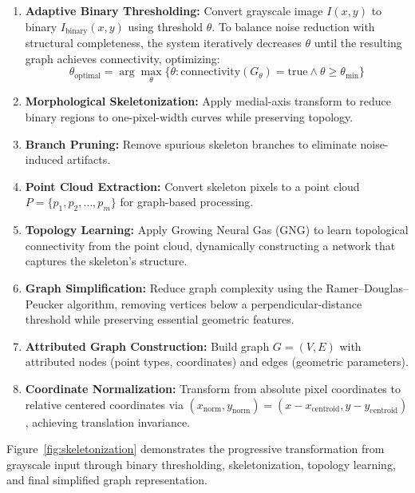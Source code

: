 \documentclass[12pt, a4paper]{article}
\begin{document}
\begin{enumerate}
\item \textbf{Adaptive Binary Thresholding:} Convert grayscale image $I(x,y)$ to binary $I_{\text{binary}}(x,y)$ using threshold $\theta$. To balance noise reduction with structural completeness, the system iteratively decreases $\theta$ until the resulting graph achieves connectivity, optimizing:
\[
\theta_{\text{optimal}} = \arg\max_{\theta} \{\theta : \text{connectivity}(G_{\theta}) = \text{true} \land \theta \geq \theta_{\text{min}}\}
\]

\item \textbf{Morphological Skeletonization:} Apply medial-axis transform to reduce binary regions to one-pixel-width curves while preserving topology.

\item \textbf{Branch Pruning:} Remove spurious skeleton branches to eliminate noise-induced artifacts.

\item \textbf{Point Cloud Extraction:} Convert skeleton pixels to a point cloud $P = \{p_1, p_2, \dots, p_m\}$ for graph-based processing.

\item \textbf{Topology Learning:} Apply Growing Neural Gas (GNG) \cite{fritzke1995} to learn topological connectivity from the point cloud, dynamically constructing a network that captures the skeleton's structure.

\item \textbf{Graph Simplification:} Reduce graph complexity using the Ramer--Douglas--Peucker algorithm, removing vertices below a perpendicular-distance threshold while preserving essential geometric features.

\item \textbf{Attributed Graph Construction:} Build graph $G = (V, E)$ with attributed nodes (point types, coordinates) and edges (geometric parameters).

\item \textbf{Coordinate Normalization:} Transform from absolute pixel coordinates to relative centered coordinates via $(x_{\text{norm}}, y_{\text{norm}}) = (x - x_{\text{centroid}}, y - y_{\text{centroid}})$, achieving translation invariance.
\end{enumerate}

Figure~\ref{fig:skeletonization} demonstrates the progressive transformation from grayscale input through binary thresholding, skeletonization, topology learning, and final simplified graph representation.
\end{document}

